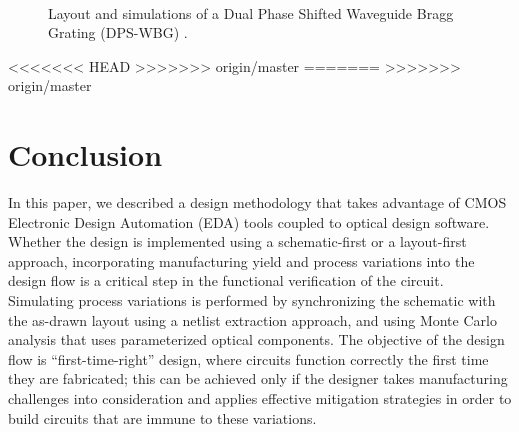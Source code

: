 \documentclass[journal]{spie}
\begin{document}
\begin{figure}[tbp]
\begin{center}   
 \\
\caption{Layout and simulations of a Dual Phase Shifted Waveguide Bragg Grating (DPS-WBG) \cite{burla2013integrated}.}
\label{Bragg}
\end{center}
\end{figure}

<<<<<<< HEAD
>>>>>>> origin/master
=======
>>>>>>> origin/master


\section{Conclusion}\label{sec6}

In this paper, we described a design methodology that takes advantage of CMOS Electronic Design Automation (EDA) tools coupled to optical design software.  Whether the design is implemented using a schematic-first or a layout-first approach, incorporating manufacturing yield and process variations into the design flow is a critical step in the functional verification of the circuit.  Simulating process variations is performed by synchronizing the schematic with the as-drawn layout using a netlist extraction approach, and using Monte Carlo analysis that uses parameterized optical components.
The  objective of the design flow is ``first-time-right'' design, where circuits function correctly the first time they are fabricated; this can be achieved only if the designer takes manufacturing challenges into consideration and applies effective mitigation strategies in order to build circuits that are immune to these variations.
\end{document}
